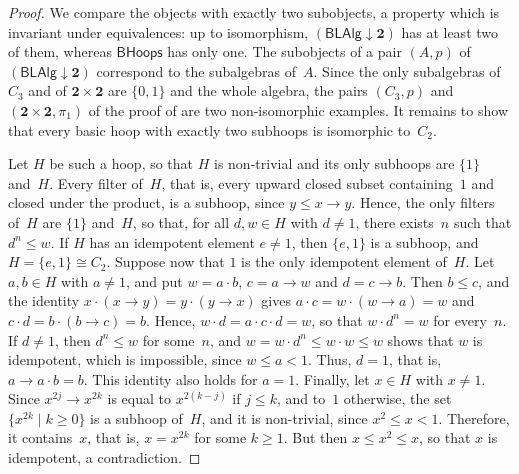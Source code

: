 \documentclass[reqno,a4paper]{amsart}
\theoremstyle{plain}
\theoremstyle{definition}
\theoremstyle{remark}
\numberwithin{equation}{section}
\newcommand{\two}{\mathbf{2}}
\newcommand{\BHoops}{\ensuremath{\mathsf{BHoops}}}
\newcommand{\BLAlg}{\ensuremath{\mathsf{BLAlg}}}
\begin{document}
\begin{proof}
We compare the objects with exactly two subobjects, a property which is invariant under equivalences: up to isomorphism, $(\BLAlg\downarrow\two)$ has at least two of them, whereas $\BHoops$ has only one. The subobjects of a pair $(A,p)$ of $(\BLAlg\downarrow\two)$ correspond to the subalgebras of~$A$. Since the only subalgebras of $C_3$ and of $\two\times\two$ are $\{0,1\}$ and the whole algebra, the pairs $(C_3,p)$ and $(\two\times\two,\pi_1)$ of the proof of  are two non-isomorphic examples. It remains to show that every basic hoop with exactly two subhoops is isomorphic to~$C_2$.

Let $H$ be such a hoop, so that $H$ is non-trivial and its only subhoops are $\{1\}$ and~$H$. Every filter of~$H$, that is, every upward closed subset containing~$1$ and closed under the product, is a subhoop, since $y\leq x\to y$. Hence, the only filters of~$H$ are $\{1\}$ and~$H$, so that, for all $d,w\in H$ with $d\neq1$, there exists~$n$ such that $d^n\leq w$. If $H$ has an idempotent element $e\neq1$, then $\{e,1\}$ is a subhoop, and $H=\{e,1\}\cong C_2$. Suppose now that $1$ is the only idempotent element of~$H$. Let $a,b\in H$ with $a\neq1$, and put $w=a\cdot b$, $c=a\to w$ and $d=c\to b$. Then $b\leq c$, and the identity $x\cdot(x\to y)=y\cdot(y\to x)$ gives $a\cdot c=w\cdot(w\to a)=w$ and $c\cdot d=b\cdot(b\to c)=b$. Hence, $w\cdot d=a\cdot c\cdot d=w$, so that $w\cdot d^n=w$ for every~$n$. If $d\neq1$, then $d^n\leq w$ for some~$n$, and $w=w\cdot d^n\leq w\cdot w\leq w$ shows that $w$ is idempotent, which is impossible, since $w\leq a<1$. Thus, $d=1$, that is, $a\to a\cdot b=b$. This identity also holds for $a=1$. Finally, let $x\in H$ with $x\neq1$. Since $x^{2j}\to x^{2k}$ is equal to $x^{2(k-j)}$ if $j\leq k$, and to~$1$ otherwise, the set $\{x^{2k}\mid k\geq0\}$ is a subhoop of~$H$, and it is non-trivial, since $x^2\leq x<1$. Therefore, it contains~$x$, that is, $x=x^{2k}$ for some $k\geq1$. But then $x\leq x^2\leq x$, so that $x$ is idempotent, a contradiction.
\end{proof}
\end{document}
